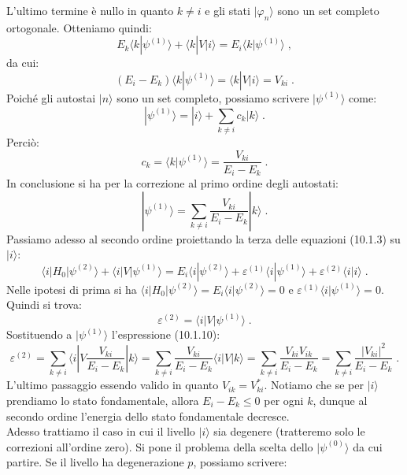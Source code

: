 \documentclass[10pt,a4paper]{report}
\theoremstyle{definition}
\numberwithin{equation}{section}
\newcommand{\bra}{\langle}
\newcommand{\ket}{\rangle}
\begin{document}
L'ultimo termine è nullo in quanto $k\ne i$ e gli stati $|\varphi_n\ket$ sono un set completo ortogonale. Otteniamo quindi:
\begin{equation}
E_k\bra k|\psi^{(1)}\ket+\bra k|V|i\ket=E_i\bra k|\psi^{(1)}\ket\;,
\end{equation}
da cui:
\begin{equation}
(E_i-E_k)\bra k|\psi^{(1)}\ket=\bra k|V|i\ket= V_{ki}\;.
\end{equation}
Poiché gli autostai $|n\ket$ sono un set completo, possiamo scrivere $|\psi^{(1)}\ket$ come:
\begin{equation}
|\psi^{(1)}\ket=|i\ket+\sum_{k\ne i}c_k|k\ket\;.
\end{equation}
Perciò:
\begin{equation}
c_k=\bra k|\psi^{(1)}\ket=\frac{V_{ki}}{E_i-E_k}\;.
\end{equation}
In conclusione si ha per la correzione al primo ordine degli autostati:
\begin{equation}
|\psi^{(1)}\ket=\sum_{k\ne i} \frac{V_{ki}}{E_i-E_k}|k\ket\;.
\end{equation}
Passiamo adesso al secondo ordine proiettando la terza delle equazioni (10.1.3) su $|i\ket$:
\begin{equation*}
\bra i|H_0|\psi^{(2)}\ket+\bra i|V|\psi^{(1)}\ket=E_i\bra i|\psi^{(2)}\ket+\varepsilon^{(1)}\bra i|\psi^{(1)}\ket+\varepsilon^{(2)}\bra i|i\ket\;.
\end{equation*}
Nelle ipotesi di prima si ha $\bra i|H_0|\psi^{(2)}\ket=E_i\bra i|\psi^{(2)}\ket=0$ e $\varepsilon^{(1)}\bra i |\psi^{(1)}\ket=0$. Quindi si trova:
\begin{equation}
\varepsilon^{(2)}=\bra i|V|\psi^{(1)}\ket\;.
\end{equation}
Sostituendo a $|\psi^{(1)}\ket$ l'espressione (10.1.10):
\begin{equation}
\varepsilon^{(2)}=\sum_{k\ne i}\bra i|V\frac{V_{ki}}{E_i-E_k}|k\ket=\sum_{k\ne i}\frac{V_{ki}}{E_i-E_k}\bra i|V|k\ket=\sum_{k\ne i} \frac{V_{ki}V_{ik}}{E_i-E_k}=\sum_{k\ne i}\frac{|V_{ki}|^2}{E_i-E_k}\;.
\end{equation}
L'ultimo passaggio essendo valido in quanto $V_{ik}=V_{ki}^*$. Notiamo che se per $|i\ket$ prendiamo lo stato fondamentale, allora $E_i-E_k\le 0$ per ogni $k$, dunque al secondo ordine l'energia dello stato fondamentale decresce. \\
Adesso trattiamo il caso in cui il livello $|i\ket$ sia degenere (tratteremo solo le correzioni all'ordine zero). Si pone il problema della scelta dello $|\psi^{(0)}\ket$ da cui partire. Se il livello ha degenerazione $p$, possiamo scrivere:
\end{document}
